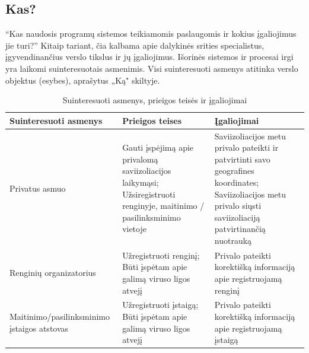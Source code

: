 \documentclass{VUMIFPSkursinis}
\begin{document}
\subsection{Kas?}\label{sec:versloReqWho}
“Kas naudosis programų sistemos
teikiamomis paslaugomis ir kokius įgaliojimus jie turi?” Kitaip tariant, čia kalbama apie
dalykinės srities specialistus, įgyvendinančius verslo tikslus ir jų įgaliojimus. Išorinės sistemos ir procesai irgi yra laikomi suinteresuotais asmenimis. Visi suinteresuoti asmenys atitinka verslo objektus (esybes), aprašytus „Ką" skiltyje.
\begin{center}
	\small
	\begin{longtable}{|L{3cm}|C{5cm}|C{7cm}|}
		\caption{Suinteresuoti asmenys, prieigos teisės ir įgaliojimai}
		\label{table:EmployeeSalary}
		\\ \hline
		Suinteresuoti asmenys                                                                                                   &
		Prieigos teises                                                                                                         &
		Įgaliojimai                                                                                                                                                    \\ \hline
		Privatus asmuo                                                                                                          &
		Gauti įspėjimą apie privalomą saviizoliacijos laikymąsi; Užsiregistruoti renginyje, maitinimo / pasilinksminimo vietoje &
		Saviizoliacijos metu privalo pateikti ir patvirtinti savo geografines koordinates; Saviizoliacijos metu privalo siųsti saviizoliaciją patvirtinančią nuotrauką \\ \hline
		Renginių organizatorius                                                                                                 &
		Užregistruoti renginį; Būti įspėtam apie galimą viruso ligos atvejį                                                     &
		Privalo pateikti korektišką informaciją apie registruojamą renginį                                                                                             \\ \hline
		Maitinimo/pasilinksminimo įstaigos atstovas                                                                             &
		Užregistruoti įstaigą; Būti įspėtam apie galimą viruso ligos atvejį                                                     &
		Privalo pateikti korektišką informaciją apie registruojamą įstaigą                                                                                             \\ \hline

\end{longtable}
\end{center}
\end{document}
